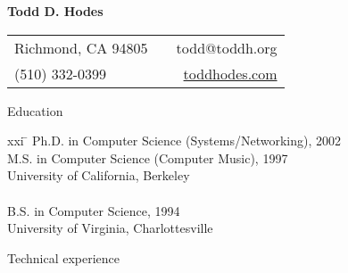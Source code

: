 \setlength{\oddsidemargin}{0.25 in}
\setlength{\evensidemargin}{-0.25 in}
\setlength{\topmargin}{-0.95 in}
\setlength{\textwidth}{6.5 in}
\setlength{\textheight}{9.6 in}
\setlength{\headsep}{0.35 in}
\setlength{\parindent}{0 in}
\setlength{\parskip}{0.05 in}


\addtolength{\evensidemargin}{-15pt}
\addtolength{\oddsidemargin}{-15pt}

\pagestyle{empty}


\begin{center} \bf
\Large
                               Todd D. Hodes
\medskip
\normalsize


\begin{tabular}{lp{3.0in}r}
Richmond, CA 94805    & & todd@toddh.org \\
(510)  332-0399& & \url{toddhodes.com} \\
\end{tabular}

\end{center}

\bigskip


\begin{bf} \large
Education \\[-18pt]
\end{bf}

\begin{tabbing}
xxi \= \kill
\>   Ph.D. in Computer Science (Systems/Networking), 2002  \\
\>   M.S. in Computer Science (Computer Music), 1997  \\
\>   University of California, Berkeley  \\
\smallskip \\[-6pt]
\>   B.S. in Computer Science, 1994 \\
\>   University of Virginia, Charlottesville \\
\end{tabbing}


\begin{bf} \large
Technical experience  \\[-16pt]
\end{bf}

